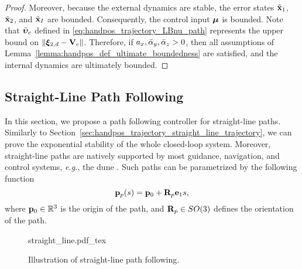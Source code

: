 \begin{proof}
    Moreover, because the external dynamics are stable, the error states $\tilde{\mathbf{x}}_1$, $\tilde{\mathbf{x}}_2$, and $\tilde{\mathbf{x}}_I$ are bounded.
    Consequently, the control input $\bm{\mu}$ is bounded.
    Note that $\Bar{\bm{\upsilon}}_e$ defined in \eqref{eq:handpos_trajectory_LBnu_path} represents the upper bound on $\left\|\bm{\xi}_{2, d} - \mathbf{V}_c\right\|$.
    Therefore, if $a_x, \Bar{\alpha}_y, \Bar{\alpha}_z > 0$, then all assumptions of Lemma~\ref{lemma:handpos_def_ultimate_boundedness} are satisfied, and the internal dynamics are ultimately bounded.
\end{proof}

\subsection{Straight-Line Path Following}
\label{sec:handpos_trajectory_straight_line_path}
In this section, we propose a path following controller for straight-line paths.
Similarly to Section~\ref{sec:handpos_trajectory_straight_line_trajectory}, we can prove the exponential stability of the whole closed-loop system.
Moreover, straight-line paths are natively supported by most guidance, navigation, and control systems, \emph{e.g.}, the \acrfull{dune} \cite{dune}.
Such paths can be parametrized by the following function
\begin{equation}
    \mathbf{p}_p(s) = \mathbf{p}_0 + \mathbf{R}_p \mathbf{e}_1 s, \label{eq:handpos_trajectory_straight_line_function}
\end{equation}
where $\mathbf{p}_0 \in \mathbb{R}^3$ is the origin of the path, and $\mathbf{R}_{p} \in SO(3)$ defines the orientation of the path.

\begin{figure}[tb]
    \centering
    \def\svgwidth{0.6\textwidth}
    {straight_line.pdf_tex}
    \caption{Illustration of straight-line path following.}
    \label{fig:straight_line}
\end{figure}

